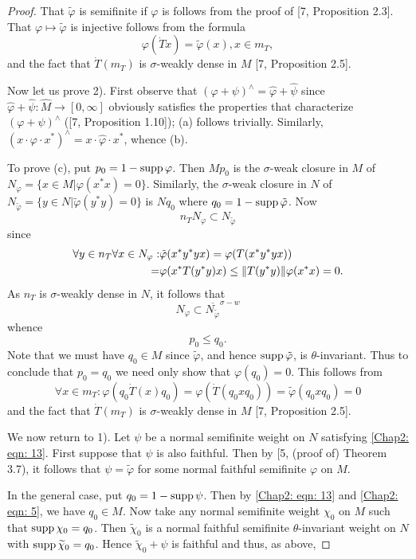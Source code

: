 \begin{proof}
    That $\tilde{\varphi}$ is semifinite if $\varphi$ is follows from the proof of [7, Proposition 2.3]. That $\varphi\mapsto \tilde{\varphi}$ is injective follows from the formula 
\[
    \varphi(\dot{T}x)=\tilde{\varphi}(x),x\in m_T,
\]  
and the fact that $\dot{T}(m_T)$ is $\sigma$-weakly dense in $M$ [7, Proposition 2.5]. \par
Now let us prove 2). First observe that $(\varphi+\psi)^\wedge=\hat{\varphi}+\hat{\psi}$ since $\hat{\varphi}+\hat{\psi}:\hat{M}\to [0,\infty]$ obviously satisfies the properties that characterize $(\varphi+\psi)^\wedge$ ([7, Proposition 1.10]); (a)
 follows trivially. Similarly, $(x\cdot \varphi\cdot x^*)^\wedge=x\cdot \hat{\varphi}\cdot x^*$, whence (b).\par
 To prove (c), put $p_0=1-\operatorname{supp} \varphi$. Then $Mp_0$ is the $\sigma$-weak closure in $M$ of $N_\varphi=\{x\in M|\varphi(x^*x)=0\}$. Similarly, the $\sigma$-weak closure in $N$ of $N_{\tilde{\varphi}}=\{y\in N|\tilde{\varphi}(y^*y)=0\}$ is $Nq_0$ where $q_0=1-\operatorname{supp} \tilde{\varphi}$. Now
\[
    n_TN_\varphi\subset N_{\tilde{\varphi}}  
\] 
since 
 \[
 \begin{split}
     \forall y\in n_T\forall x\in N_\varphi:&\tilde{\varphi}(x^*y^*yx)=\varphi(T(x^*y^*yx))\\
     =&\varphi(x^*T(y^*y)x)\leq \norm{T(y^*y)}\varphi(x^*x)=0.
 \end{split}    
 \]
 As $n_T$ is $\sigma$-weakly dense in $N$, it follows that 
 \[
    N_\varphi\subset \overline{N_{\tilde{\varphi}}}^{\sigma-w}  
 \]
 whence 
 \[
   p_0\leq q_0.  
 \]
 Note that we must have $q_0\in M$ since $\tilde{\varphi}$, and hence $\operatorname{supp} \tilde{\varphi}$, is $\theta$-invariant. Thus to conclude that $p_0=q_0$ we need only show that $\varphi(q_0)=0$. This follows from 
 \[
     \forall x\in m_T:\varphi(q_0\dot{T}(x)q_0)=\varphi(\dot{T}(q_0xq_0))=\tilde{\varphi}(q_0xq_0)=0
 \]
 and the fact that $\dot{T}(m_T)$ is $\sigma$-weakly dense in $M$ [7, Proposition 2.5].\par
 We now return to 1). Let $\psi$ be a normal semifinite weight on 
$N$ satisfying \eqref{Chap2: eqn: 13}. First suppose that $\psi$ is also faithful. Then by [5, (proof of) Theorem 3.7), it follows that $\psi=\tilde{\varphi}$ for some normal faithful semifinite $\varphi$ on $M$.\par 
 In the general case, put $q_0=1-\operatorname{supp} \psi$. Then by \eqref{Chap2: eqn: 13} and \eqref{Chap2: eqn: 5}, we have $q_0\in M$. Now take any normal semifinite weight $\chi_0$ on $M$ such that $\operatorname{supp}\chi_0=q_0$. Then $\widetilde{\chi}_0$ is a normal faithful semifinite $\theta$-invariant weight on $N$ with $\operatorname{supp} \widetilde{\chi}_0=q_0$. Hence $\widetilde{\chi}_0+\psi$ is faithful and thus, as above, 

\end{proof}
